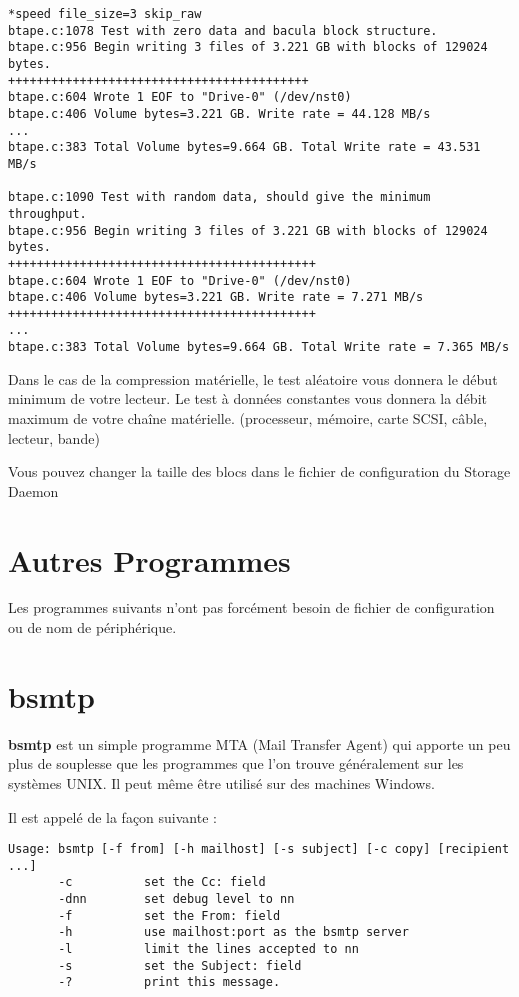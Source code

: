 \begin{verbatim}
*speed file_size=3 skip_raw
btape.c:1078 Test with zero data and bacula block structure.
btape.c:956 Begin writing 3 files of 3.221 GB with blocks of 129024 bytes.
++++++++++++++++++++++++++++++++++++++++++
btape.c:604 Wrote 1 EOF to "Drive-0" (/dev/nst0)
btape.c:406 Volume bytes=3.221 GB. Write rate = 44.128 MB/s
...
btape.c:383 Total Volume bytes=9.664 GB. Total Write rate = 43.531 MB/s

btape.c:1090 Test with random data, should give the minimum throughput.
btape.c:956 Begin writing 3 files of 3.221 GB with blocks of 129024 bytes.
+++++++++++++++++++++++++++++++++++++++++++
btape.c:604 Wrote 1 EOF to "Drive-0" (/dev/nst0)
btape.c:406 Volume bytes=3.221 GB. Write rate = 7.271 MB/s
+++++++++++++++++++++++++++++++++++++++++++
...
btape.c:383 Total Volume bytes=9.664 GB. Total Write rate = 7.365 MB/s

\end{verbatim}

Dans le cas de la compression matérielle, le test aléatoire vous donnera le
début minimum de votre lecteur. Le test à données constantes vous donnera la
débit maximum de votre chaîne matérielle. (processeur, mémoire, carte SCSI, 
câble, lecteur, bande)

Vous pouvez changer la taille des blocs dans le fichier de configuration du
Storage Daemon

\section{Autres Programmes}

Les programmes suivants n'ont pas forcément besoin de fichier de configuration
ou de nom de périphérique.

\section{bsmtp}
\label{bsmtp}

{\bf bsmtp} est un simple programme MTA (Mail Transfer Agent) qui apporte un peu
plus de souplesse que les programmes que l'on trouve généralement sur les 
systèmes UNIX. Il peut même être utilisé sur des machines Windows.

Il est appelé de la façon suivante :

\footnotesize
\begin{verbatim}
Usage: bsmtp [-f from] [-h mailhost] [-s subject] [-c copy] [recipient ...]
       -c          set the Cc: field
       -dnn        set debug level to nn
       -f          set the From: field
       -h          use mailhost:port as the bsmtp server
       -l          limit the lines accepted to nn
       -s          set the Subject: field
       -?          print this message.
\end{verbatim}
\normalsize

